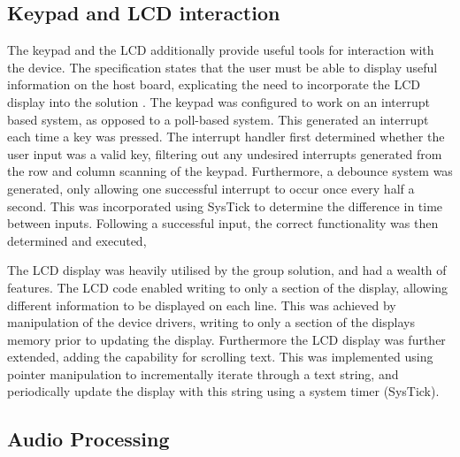 \subsection*{Keypad and LCD interaction}

The keypad and the LCD additionally provide useful tools for interaction with 
the device. The specification states that the user must be able to display 
useful information on the host board, explicating the need to incorporate the 
LCD display into the solution \cite{specification}. 
The keypad was configured to work on an interrupt based system, as opposed to 
a poll-based system. This generated an interrupt each time a key was pressed. 
The interrupt handler first determined whether the user input was a valid key, 
filtering out any undesired interrupts generated from the row and column 
scanning of the keypad. 
Furthermore, a debounce system was generated, only allowing one successful 
interrupt to occur once every half a second. This was incorporated using SysTick
to determine the difference in time between inputs. 
Following a successful input, the correct functionality was then determined and 
executed, 
\par\bigskip\noindent
The LCD display was heavily utilised by the group solution, and had a wealth of 
features. 
The LCD code enabled writing to only a section of the display, allowing different 
information to be displayed on each line. 
This was achieved by manipulation of the device drivers, writing to only a 
section of the displays memory prior to updating the display. 
Furthermore the LCD display was further extended, adding the capability for 
scrolling text. 
This was implemented using pointer manipulation to incrementally iterate through 
a text string, and periodically update the display with this string using 
a system timer (SysTick). 

\subsection*{Audio Processing}

